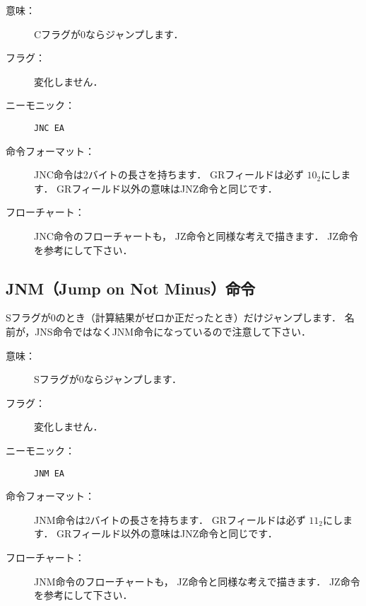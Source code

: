 \begin{description}
\item[意味：]Cフラグが0ならジャンプします．

\item[フラグ：]変化しません．

\item[ニーモニック：]\texttt{JNC  EA}

\item[命令フォーマット：]JNC命令は2バイトの長さを持ちます．
  GRフィールドは必ず $10_2$にします．
  GRフィールド以外の意味はJNZ命令と同じです．


\item[フローチャート：]JNC命令のフローチャートも，
  JZ命令と同様な考えで描きます．
  JZ命令を参考にして下さい．

\end{description}

\subsection{JNM（Jump on Not Minus）命令}
Sフラグが0のとき（計算結果がゼロか正だったとき）だけジャンプします．
名前が，JNS命令ではなくJNM命令になっているので注意して下さい．

\begin{description}
\item[意味：]Sフラグが0ならジャンプします．

\item[フラグ：]変化しません．

\item[ニーモニック：]\texttt{JNM  EA}

\item[命令フォーマット：]JNM命令は2バイトの長さを持ちます．
  GRフィールドは必ず $11_2$にします．
  GRフィールド以外の意味はJNZ命令と同じです．


\item[フローチャート：]JNM命令のフローチャートも，
  JZ命令と同様な考えで描きます．
  JZ命令を参考にして下さい．

\end{description}

